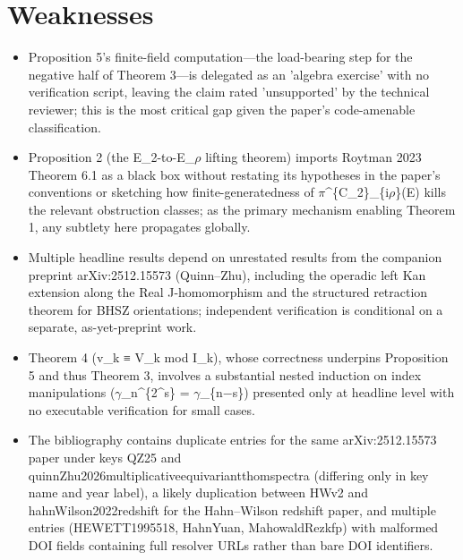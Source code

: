 \documentclass[11pt]{article}
\begin{document}
\section*{Weaknesses}
\begin{itemize}[leftmargin=*]
  \item Proposition 5's finite-field computation---the load-bearing step for the negative half of Theorem 3---is delegated as an 'algebra exercise' with no verification script, leaving the claim rated 'unsupported' by the technical reviewer; this is the most critical gap given the paper's code-amenable classification.
  \item Proposition 2 (the E\_2-to-E\_\ensuremath{\rho} lifting theorem) imports Roytman 2023 Theorem 6.1 as a black box without restating its hypotheses in the paper's conventions or sketching how finite-generatedness of \ensuremath{\pi}\^{}\{C\_2\}\_\{i\ensuremath{\rho}\}(E) kills the relevant obstruction classes; as the primary mechanism enabling Theorem 1, any subtlety here propagates globally.
  \item Multiple headline results depend on unrestated results from the companion preprint arXiv:2512.15573 (Quinn--Zhu), including the operadic left Kan extension along the Real J-homomorphism and the structured retraction theorem for BHSZ orientations; independent verification is conditional on a separate, as-yet-preprint work.
  \item Theorem 4 (v\_k ≡ V\_k mod I\_k), whose correctness underpins Proposition 5 and thus Theorem 3, involves a substantial nested induction on index manipulations (\ensuremath{\gamma}\_n\^{}\{2\^{}s\} = \ensuremath{\gamma}\_\{n\ensuremath{-}s\}) presented only at headline level with no executable verification for small cases.
  \item The bibliography contains duplicate entries for the same arXiv:2512.15573 paper under keys QZ25 and quinnZhu2026multiplicativeequivariantthomspectra (differing only in key name and year label), a likely duplication between HWv2 and hahnWilson2022redshift for the Hahn--Wilson redshift paper, and multiple entries (HEWETT1995518, HahnYuan, MahowaldRezkfp) with malformed DOI fields containing full resolver URLs rather than bare DOI identifiers.
\end{itemize}
\end{document}
